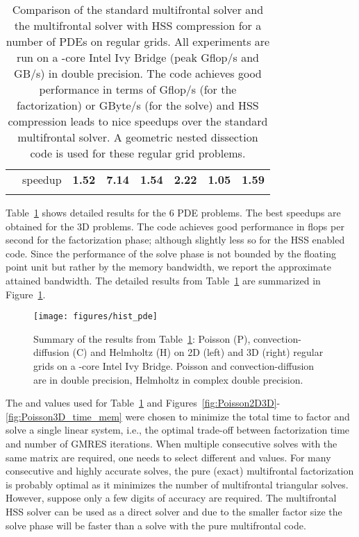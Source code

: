 \documentclass{article}
\newcommand{\tm}{\textsuperscript{\textregistered}}
\begin{document}
\begin{table}[htp!]
\begin{center}
\begin{tabular}{|c|l||c|c|c|c|c|c|}
      \hhline{|~-||-|-|-|-|-|-|}                                                               
&   speedup                              &  \textbf{1.52}  & \textbf{7.14}  & \textbf{1.54} & \textbf{2.22} & \textbf{1.05} & \textbf{1.59}    \\
      \hhline{|--||-|-|-|-|-|-|}
    \end{tabular}
  \end{center}
  \caption{\footnotesize Comparison of the standard multifrontal solver and the multifrontal
    solver with HSS compression for a number of PDEs on regular
    grids. All experiments are run on a -core Intel\tm{} Ivy Bridge (peak
    Gflop/s and GB/s) in double
    precision. The code achieves good performance in terms of Gflop/s (for the
    factorization) or GByte/s (for the solve) and HSS compression leads to
    nice speedups over the standard multifrontal solver.
    A geometric nested dissection code is used for these regular grid problems.}
  \label{tab:pde_table}
\end{table}
Table~\ref{tab:pde_table} shows detailed results for the 6 PDE
problems. The best speedups are obtained for the 3D problems. The code
achieves good performance in flops per second for the factorization
phase; although slightly less so for the HSS enabled code. Since the
performance of the solve phase is not bounded by the floating point
unit but rather by the memory bandwidth, we report the approximate
attained bandwidth.
The detailed results from Table~\ref{tab:pde_table} are summarized in
Figure~\ref{fig:hist_pde}.
\begin{figure}
  \begin{center}
    \texttt{[image: figures/hist\_pde]}
  \end{center}
  \caption{\footnotesize Summary of the results from
    Table~\ref{tab:pde_table}: Poisson (P), convection-diffusion (C)
    and Helmholtz (H) on 2D (left) and 3D (right) regular grids on a
    -core Intel\tm{} Ivy Bridge. Poisson and convection-diffusion
    are in double precision, Helmholtz in complex double precision.}
  \label{fig:hist_pde}
\end{figure}


The  and  values used for
Table~\ref{tab:pde_table} and
Figures~\ref{fig:Poisson2D3D}-\ref{fig:Poisson3D_time_mem} were chosen
to minimize the total time to factor and solve a single linear system,
i.e., the optimal trade-off between factorization time and number of
GMRES iterations. When multiple consecutive solves with the same
matrix are required, one needs to select different  and
 values. For many consecutive and highly accurate solves,
the pure (exact) multifrontal factorization is probably optimal as it
minimizes the number of multifrontal triangular solves. However,
suppose only a few digits of accuracy are required. The multifrontal
HSS solver can be used as a direct solver and due to the smaller
factor size the solve phase will be faster than a solve with the pure
multifrontal code.
\end{document}
